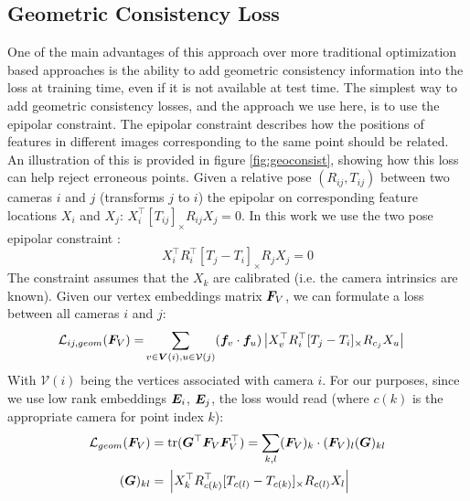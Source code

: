 \documentclass{article} %
\newcommand{\cross}[1]{[#1]_{\times}}
\begin{document}
\subsection{Geometric Consistency Loss}

One of the main advantages of this approach over more traditional optimization based approaches is the ability to add geometric consistency information into the loss at training time, even if it is not available at test time.
The simplest way to add geometric consistency losses, and the approach we use here, is to use the epipolar constraint.
The epipolar constraint describes how the positions of features in different images corresponding to the same point should be related.
An illustration of this is provided in figure \ref{fig:geoconsist}, showing how this loss can help reject erroneous points.
Given a relative pose $(R_{ij}, T_{ij})$ between two cameras $i$ and $j$  (transforms $j$ to $i$) the epipolar on corresponding feature locations $X_i$ and $X_j$: $X_{i}^\top \cross{T_{ij}}R_{ij} X_{j} = 0$.
In this work we use the two pose epipolar constraint \cite{tron2014quotient}:
\begin{equation}
X_{i}^\top R_{i}^\top \cross{T_{j} - T_{i}}R_{j} X_{j} = 0
\label{eq:essential_constraint}
\end{equation}
The constraint assumes that the $X_k$ are calibrated (i.e. the camera intrinsics are known). 
Given our vertex embeddings matrix ${\bm{F}}_V$, we can formulate a loss between all cameras $i$ and $j$:
\begin{align}
\mathcal{L}_{ij,geom}(\mF_V) = 
&\sum_{v \in \mV(i),u \in \mathcal{V}(j)} (\vf_v \cdot \vf_u) \left|X_{v}^\top R_{i}^\top \cross{T_{j} - T_{i}}R_{c_j} X_{u}\right|
\label{eq:geom_cost}
\end{align}
With $\mathcal{V}(i)$ being the vertices associated with camera $i$.
For our purposes, since we use low rank embeddings ${\bm{E}}_{i}$, ${\bm{E}}_{j}$, the loss would read (where $c(k)$ is the appropriate camera for point index $k$):
\begin{align} 
\mathcal{L}_{geom}(\mF_V)
=&\; \mathrm{tr}(\mG^\top \mF_V\mF_V^\top) = \sum_{k,l} (\mF_V)_{k} \cdot (\mF_V)_{l} (\mG)_{kl} \label{eq:geom_cost2} \\
(\mG)_{kl} =&\; \left|X_{k}^\top R_{c(k)}^\top \cross{T_{c(l)} - T_{c(k)}}R_{c(l)} X_{l}\right| \nonumber
\end{align}
\end{document}
